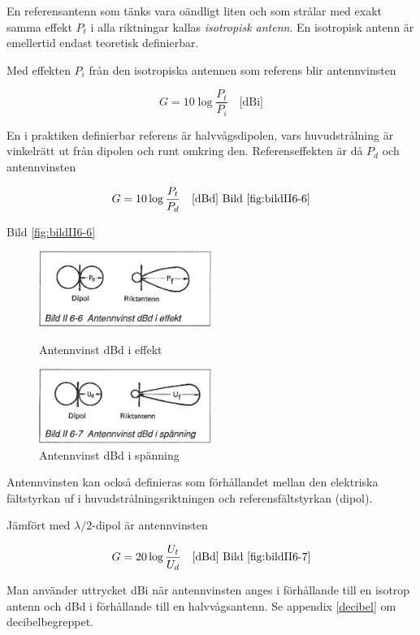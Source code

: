 En referensantenn som tänks vara oändligt liten och som strålar med
exakt samma effekt \(P_t\) i alla riktningar kallas \emph{isotropisk
  antenn}.  En isotropisk antenn är emellertid endast teoretisk
definierbar.

Med effekten \(P_i\) från den isotropiska antennen som referens blir
antennvinsten

\[G = 10 \log\frac{P_t}{P_i} \quad \text{[dBi]}\]

En i praktiken definierbar referens är halvvågsdipolen, vars
huvudstrålning är vinkelrätt ut från dipolen och runt omkring den.
Referenseffekten är då \(P_d\) och antennvinsten

\[G = 10 \log\frac{P_t}{P_d} \quad \text{[dBd] Bild \ref{fig:bildII6-6}}\]

Bild \ref{fig:bildII6-6}

\begin{figure}
  \includegraphics[width=0.5\textwidth]{images/bild_2_6-06}
  \caption{Antennvinst dBd i effekt}
  \label{fig:bildII6-6}

  \includegraphics[width=0.5\textwidth]{images/bild_2_6-07}
  \caption{Antennvinst dBd i spänning}
  \label{fig:bildII6-7}
\end{figure}

Antennvinsten kan också definieras som förhållandet mellan den
elektriska fältstyrkan uf i huvudstrålningsriktningen och
referensfältstyrkan (dipol).

Jämfört med \(\lambda/2\)-dipol är antennvinsten

\[G = 20 \log\frac{U_t}{U_d} \quad \text{[dBd] Bild \ref{fig:bildII6-7}}\]

Man använder uttrycket dBi när antennvinsten anges i förhållande till
en isotrop antenn och dBd i förhållande till en halvvågsantenn.  Se
appendix \ref{decibel} om decibelbegreppet.

